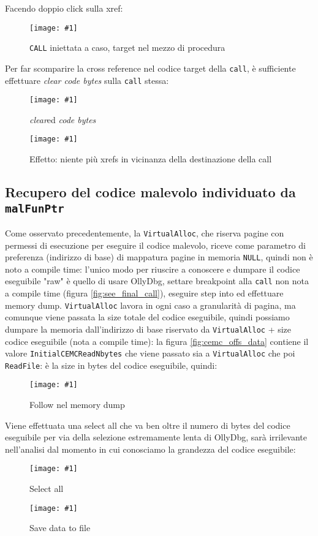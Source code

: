 \documentclass[
    a4paper, %
    11pt %
]{article}
\newcommand{\pic}[4]{\begin{figure}[H]
            \centering
            \texttt{[image: \#1]}
            \caption{#2}
            \label{fig:#1}
            \end{figure}}
\begin{document}
            \pagebreak
            
            Facendo doppio click sulla xref:
            \pic{ghidra_midcall_call}{\texttt{CALL} iniettata a caso, target nel mezzo di procedura}
            {14cm}{2cm}

            Per far scomparire la cross reference nel codice target della \texttt{call}, è sufficiente 
            effettuare \textit{clear code bytes} sulla \texttt{call} stessa:

            \pic{ghidra_cleared}{\textit{clear}ed \textit{code bytes}}{7cm}{4cm}
            \pic{ghidra_cleared_effect}{Effetto: niente più xrefs in vicinanza della destinazione della call}{12cm}{2.5cm}

            \subsection*{Recupero del codice malevolo individuato da \texttt{malFunPtr}}

            Come osservato precedentemente, la \texttt{VirtualAlloc}, che riserva pagine con permessi di 
            esecuzione per eseguire il codice malevolo, riceve come parametro di preferenza (indirizzo di 
            base) di mappatura pagine in memoria \texttt{NULL}, quindi non è noto a compile time: l'unico
            modo per riuscire a conoscere e dumpare il codice eseguibile "raw" è quello di usare OllyDbg,
            settare breakpoint alla \texttt{call} non nota a compile time (figura \ref{fig:see_final_call}), eseguire step into ed 
            effettuare memory dump. \texttt{VirtualAlloc} lavora in ogni caso a granularità di pagina, ma 
            comunque viene passata la size totale del codice eseguibile, quindi possiamo dumpare la memoria
            dall'indirizzo di base riservato da \texttt{VirtualAlloc} + size codice eseguibile (nota a
            compile time): la figura \ref{fig:cemc_offs_data} contiene il valore 
            \texttt{Initial\textunderscore CEMC\textunderscore Read\textunderscore Nbytes} che viene 
            passato sia a \texttt{VirtualAlloc} che poi 
            \texttt{ReadFile}: è la size in bytes del codice eseguibile, quindi:

            \pic{odbg_mal_follow}{Follow nel memory dump}{15cm}{6cm}
            Viene effettuata una select all che va ben oltre il numero di bytes del codice eseguibile
            per via della selezione estremamente lenta di OllyDbg, sarà irrilevante nell'analisi
            dal momento in cui conosciamo la grandezza del codice eseguibile:
            \pic{odbg_mal_selectall}{Select all}{10cm}{7cm}
            \pic{odbg_mal_dump}{Save data to file}{9cm}{7cm}
\end{document}
